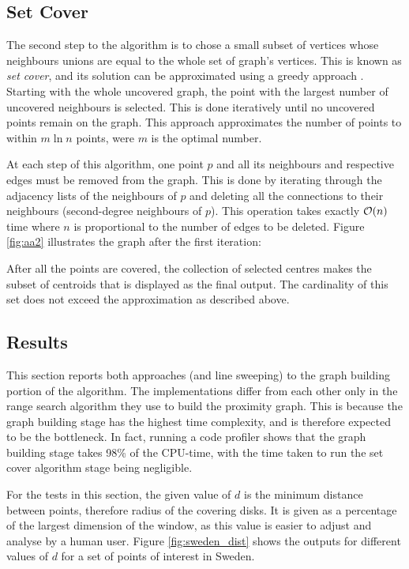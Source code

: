 \subsection{Set Cover}
The second step to the algorithm is to chose a small subset of vertices whose neighbours unions are equal to the whole set of graph's vertices. This is known as \emph{set cover}, and its solution can be approximated using a greedy approach \cite{approxalgos}. Starting with the whole uncovered graph, the point with the largest number of uncovered neighbours is selected. This is done iteratively until no uncovered points remain on the graph. This approach approximates the number of points to within $m \ln{n}$ points, were $m$ is the optimal number.

At each step of this algorithm, one point $p$ and all its neighbours and respective edges must be removed from the graph. This is done by iterating through the adjacency lists of the neighbours of $p$ and deleting all the connections to their neighbours (second-degree neighbours of $p$). This operation takes exactly $\mathcal{O}(n)$ time where $n$ is proportional to the number of edges to be deleted. Figure \ref{fig:aa2} illustrates the graph after the first iteration:



After all the points are covered, the collection of selected centres makes the subset of centroids that is displayed as the final output. The cardinality of this set does not exceed the approximation as described above.


\subsection{Results}
This section reports both approaches (\kdtrees and line sweeping) to the graph building portion of the algorithm. The implementations differ from each other only in the range search algorithm they use to build the proximity graph. This is because the graph building stage has the highest time complexity, and is therefore expected to be the bottleneck. In fact, running a code profiler shows that the graph building stage takes 98\% of the CPU-time, with the time taken to run the set cover algorithm stage being negligible.

For the tests in this section, the given value of $d$ is the minimum distance between points, therefore radius of the covering disks. It is given as a percentage of the largest dimension of the window, as this value is easier to adjust and analyse by a human user.
Figure \ref{fig:sweden_dist} shows the outputs for different values of $d$ for a set of points of interest in Sweden.

